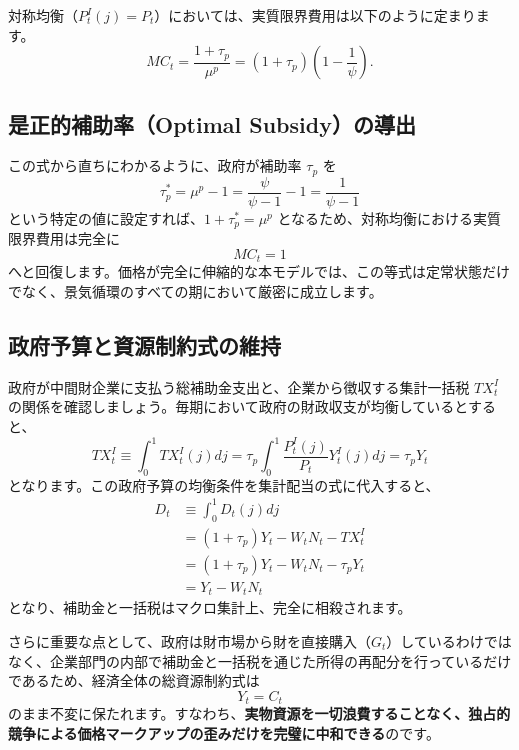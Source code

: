 \documentclass[
  japanese,
  lualatex,
  ja=standard,
  12pt,
  a4paper]{ltjsarticle}
\begin{document}
対称均衡（\(P_t^I(j) = P_t\)）においては、実質限界費用は以下のように定まります。
\[
MC_t = \frac{1+\tau_p}{\mu^p} = (1+\tau_p) \left( 1 - \frac{1}{\psi} \right).
\]

\subsection{是正的補助率（Optimal
Subsidy）の導出}\label{ux662fux6b63ux7684ux88dcux52a9ux7387optimal-subsidyux306eux5c0eux51fa}

この式から直ちにわかるように、政府が補助率 \(\tau_p\) を \[
\tau_p^* = \mu^p - 1 = \frac{\psi}{\psi-1} - 1 = \frac{1}{\psi-1}
\] という特定の値に設定すれば、\(1+\tau_p^* = \mu^p\)
となるため、対称均衡における実質限界費用は完全に \[
MC_t = 1
\]
へと回復します。価格が完全に伸縮的な本モデルでは、この等式は定常状態だけでなく、景気循環のすべての期において厳密に成立します。

\subsection{政府予算と資源制約式の維持}\label{ux653fux5e9cux4e88ux7b97ux3068ux8cc7ux6e90ux5236ux7d04ux5f0fux306eux7dadux6301}

政府が中間財企業に支払う総補助金支出と、企業から徴収する集計一括税
\(TX_t^I\)
の関係を確認しましょう。毎期において政府の財政収支が均衡しているとすると、
\[
TX_t^I \equiv \int_0^1 TX_t^I(j) dj = \tau_p \int_0^1 \frac{P_t^I(j)}{P_t} Y_t^I(j) dj = \tau_p Y_t
\] となります。この政府予算の均衡条件を集計配当の式に代入すると、 \[
\begin{aligned}
D_t &\equiv \int_0^1 D_t(j) dj\\
&= (1+\tau_p) Y_t - W_t N_t - TX_t^I\\
&= (1+\tau_p) Y_t - W_t N_t - \tau_p Y_t\\
&= Y_t - W_t N_t
\end{aligned}
\] となり、補助金と一括税はマクロ集計上、完全に相殺されます。

さらに重要な点として、政府は財市場から財を直接購入（\(G_t\)）しているわけではなく、企業部門の内部で補助金と一括税を通じた所得の再配分を行っているだけであるため、経済全体の総資源制約式は
\[
Y_t = C_t
\]
のまま不変に保たれます。すなわち、\textbf{実物資源を一切浪費することなく、独占的競争による価格マークアップの歪みだけを完璧に中和できる}のです。
\end{document}
